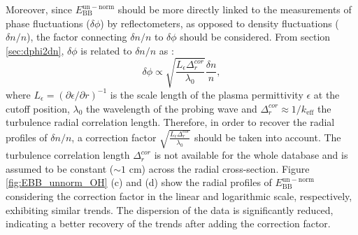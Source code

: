Moreover, since $E_\mathrm{BB}^\mathrm{un-norm}$ should be more directly linked to the measurements of phase fluctuations ($\delta\phi$) by reflectometers, as opposed to density fluctuations ($\delta n/n$), the factor connecting $\delta n/n$ to $\delta\phi$ should be considered. From section \ref{sec:dphi2dn}, $\delta\phi$ is related to $\delta n/n$ as \cite{Shelukhin_2006_PPR}:%
\begin{equation}
  \delta\phi \propto \sqrt{\frac{L_{\epsilon} \Delta_r^{cor}}{\lambda_0}}\frac{\delta n}{n},
\end{equation}
\noindent where $L_{\epsilon}=(\partial\epsilon/\partial r)^{-1}$ is the scale length of the plasma permittivity $\epsilon$ at the cutoff position, $\lambda_0$ the wavelength of the probing wave and $\Delta_r^{cor} \approx 1/k_\mathrm{eff}$ the turbulence radial correlation length. Therefore, in order to recover the radial profiles of $\delta n/n$, a correction factor $\sqrt{\frac{L_{\epsilon} \Delta_r^{cor}}{\lambda_0}}$ should be taken into account. The turbulence correlation length $\Delta_r^{cor}$ is not available for the whole database and is assumed to be constant ($\sim 1$ cm) across the radial cross-section. Figure \ref{fig:EBB_unnorm_OH} (c) and (d) show the radial profiles of $E_\mathrm{BB}^\mathrm{un-norm}$ considering the correction factor in the linear and logarithmic scale, respectively, exhibiting similar trends. The dispersion of the data is significantly reduced, indicating a better recovery of the trends after adding the correction factor.


